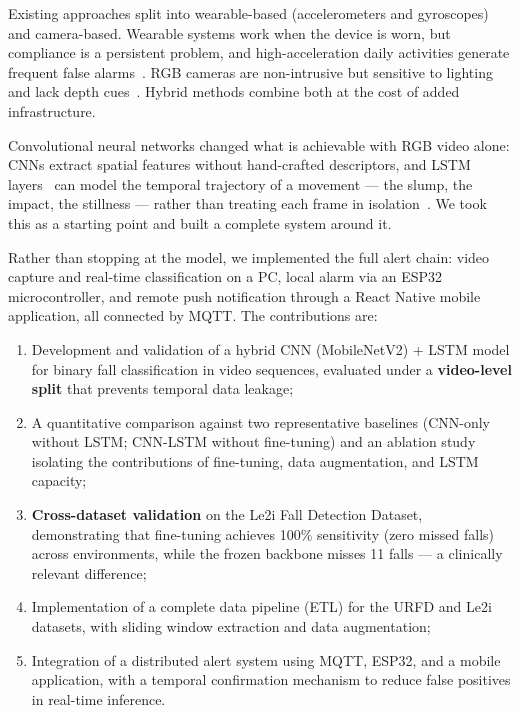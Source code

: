 \documentclass[runningheads]{llncs}
\begin{document}
Existing approaches split into wearable-based (accelerometers and gyroscopes) and camera-based. Wearable systems work when the device is worn, but compliance is a persistent problem, and high-acceleration daily activities generate frequent false alarms~\cite{kwolek2014,mubashir2013}. RGB cameras are non-intrusive but sensitive to lighting and lack depth cues~\cite{kwolek2014}. Hybrid methods combine both at the cost of added infrastructure.

Convolutional neural networks changed what is achievable with RGB video alone: CNNs extract spatial features without hand-crafted descriptors, and LSTM layers~\cite{lstm1997} can model the temporal trajectory of a movement --- the slump, the impact, the stillness --- rather than treating each frame in isolation~\cite{lu2019}. We took this as a starting point and built a complete system around it.

Rather than stopping at the model, we implemented the full alert chain: video capture and real-time classification on a PC, local alarm via an ESP32 microcontroller, and remote push notification through a React Native mobile application, all connected by MQTT. The contributions are:

\begin{enumerate}
  \item Development and validation of a hybrid CNN (MobileNetV2) + LSTM model for binary fall classification in video sequences, evaluated under a \textbf{video-level split} that prevents temporal data leakage;
  \item A quantitative comparison against two representative baselines (CNN-only without LSTM; CNN-LSTM without fine-tuning) and an ablation study isolating the contributions of fine-tuning, data augmentation, and LSTM capacity;
  \item \textbf{Cross-dataset validation} on the Le2i Fall Detection Dataset, demonstrating that fine-tuning achieves 100\% sensitivity (zero missed falls) across environments, while the frozen backbone misses 11 falls --- a clinically relevant difference;
  \item Implementation of a complete data pipeline (ETL) for the URFD and Le2i datasets, with sliding window extraction and data augmentation;
  \item Integration of a distributed alert system using MQTT, ESP32, and a mobile application, with a temporal confirmation mechanism to reduce false positives in real-time inference.
\end{enumerate}
\end{document}
